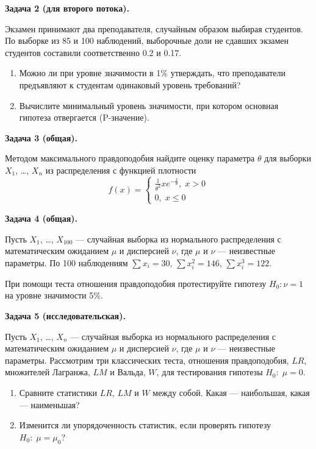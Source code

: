 \documentclass[12pt, a4paper]{article}\usepackage[]{graphicx}\usepackage[]{color}
\begin{document}
\vspace{0.5cm}

\textbf{Задача 2 (для второго потока).}

Экзамен принимают два преподавателя, случайным образом выбирая студентов. По выборке из 85 и 100 наблюдений, выборочные доли не сдавших экзамен студентов составили соответственно 0.2  и 0.17.
\begin{enumerate}
\item Можно ли при уровне значимости в 1\% утверждать, что преподаватели предъявляют к студентам одинаковый уровень требований?
\item Вычислите минимальный уровень значимости, при котором основная гипотеза отвергается (P-значение).
\end{enumerate}

\vspace{0.5cm}

\textbf{Задача 3 (общая).}


Методом максимального правдоподобия найдите оценку параметра $\theta$ для выборки $X_1$, \ldots, $X_n$ из распределения с функцией плотности
\[
f(x)=\begin{cases}
\frac{1}{\theta^2}xe^{-\frac{x}{\theta}}, \; x>0 \\
0, \; x\leq 0
\end{cases}
\]

\vspace{0.5cm}

\textbf{Задача 4 (общая).}

Пусть $X_1$, \ldots, $X_{100}$ — случайная выборка из нормального распределения с математическим ожиданием $\mu$ и дисперсией $\nu$, где $\mu$ и $\nu$ — неизвестные параметры. По 100 наблюдениям $\sum x_i=30$, $\sum x_i^2=146$, $\sum x_i^3=122$.

При помощи теста отношения правдоподобия протестируйте гипотезу $H_0: \nu=1$ на уровне значимости 5\%.


\textbf{Задача 5 (исследовательская).}

\vspace{0.1cm}

Пусть $X_1$, \ldots, $X_{n}$ — случайная выборка из нормального распределения с математическим ожиданием $\mu$ и дисперсией $\nu$, где $\mu$ и $\nu$ — неизвестные параметры. Рассмотрим три классических теста, отношения правдоподобия, $LR$, множителей Лагранжа, $LM$ и Вальда, $W$, для тестирования гипотезы $H_0: \; \mu=0$.

\begin{enumerate}
\item Сравните  статистики $LR$, $LM$ и $W$ между собой. Какая — наибольшая, какая — наименьшая?
\item Изменится ли упорядоченность статистик, если проверять гипотезу $H_0: \; \mu=\mu_0$?
\end{enumerate}
\end{document}

